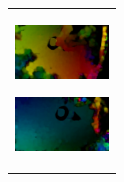 \begin{enumerate}
\begin{end}
\begin{figure}[H]
\begin{tabular}{l}
      \begin{minipage}{0.165\hsize}
        \begin{center}
          \includegraphics[clip, width=2.5cm]{./Figures/optic_commandmatemate4.eps}
          \hspace{0.1cm} { }
        \end{center}
      \end{minipage}
      \begin{minipage}{0.165\hsize}
        \begin{center}
          \includegraphics[clip, width=2.5cm]{./Figures/optic_commandmatemate5.eps}
          \hspace{2.2cm} { }
        \end{center}
      \end{minipage}
\\ %


\end{tabular}
\end{figure}
\end{end}
\end{enumerate}

